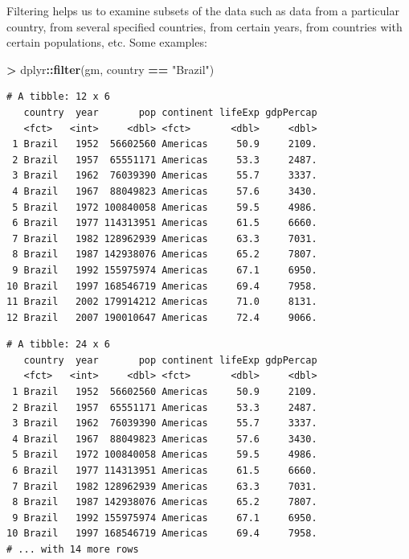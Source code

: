 \documentclass[]{krantz}
\makeatletter
\newenvironment{Shaded}{\begin{snugshade}}{\end{snugshade}}
\newcommand{\KeywordTok}[1]{\textcolor[rgb]{0.27,0.27,0.27}{\textbf{#1}}}
\newcommand{\NormalTok}[1]{#1}
\newcommand{\OperatorTok}[1]{\textcolor[rgb]{0.43,0.43,0.43}{\textbf{#1}}}
\newcommand{\StringTok}[1]{\textcolor[rgb]{0.5,0.5,0.5}{#1}}
\newenvironment{kframe}{%
\medskip{}
\setlength{\fboxsep}{.8em}
 \def\at@end@of@kframe{}%
 \ifinner\ifhmode%
  \def\at@end@of@kframe{\end{minipage}}%
  \begin{minipage}{\columnwidth}%
 \fi\fi%
 \def\FrameCommand##1{\hskip\@totalleftmargin \hskip-\fboxsep
 \colorbox{shadecolor}{##1}\hskip-\fboxsep
     \hskip-\linewidth \hskip-\@totalleftmargin \hskip\columnwidth}%
 \MakeFramed {\advance\hsize-\width
   \@totalleftmargin\z@ \linewidth\hsize
   \@setminipage}}%
 {\par\unskip\endMakeFramed%
 \at@end@of@kframe}
\renewenvironment{Shaded}{\begin{kframe}}{\end{kframe}}
\makeatother
\begin{document}
Filtering helps us to examine subsets of the data such as data from a particular country, from several specified countries, from certain years, from countries with certain populations, etc. Some examples:

\begin{Shaded}
\begin{Highlighting}[]
\OperatorTok{>}\StringTok{ }\NormalTok{dplyr}\OperatorTok{::}\KeywordTok{filter}\NormalTok{(gm, country }\OperatorTok{==}\StringTok{ "Brazil"}\NormalTok{)}
\end{Highlighting}
\end{Shaded}

\begin{verbatim}
# A tibble: 12 x 6
   country  year       pop continent lifeExp gdpPercap
   <fct>   <int>     <dbl> <fct>       <dbl>     <dbl>
 1 Brazil   1952  56602560 Americas     50.9     2109.
 2 Brazil   1957  65551171 Americas     53.3     2487.
 3 Brazil   1962  76039390 Americas     55.7     3337.
 4 Brazil   1967  88049823 Americas     57.6     3430.
 5 Brazil   1972 100840058 Americas     59.5     4986.
 6 Brazil   1977 114313951 Americas     61.5     6660.
 7 Brazil   1982 128962939 Americas     63.3     7031.
 8 Brazil   1987 142938076 Americas     65.2     7807.
 9 Brazil   1992 155975974 Americas     67.1     6950.
10 Brazil   1997 168546719 Americas     69.4     7958.
11 Brazil   2002 179914212 Americas     71.0     8131.
12 Brazil   2007 190010647 Americas     72.4     9066.
\end{verbatim}

\begin{Shaded}
\end{Shaded}

\begin{verbatim}
# A tibble: 24 x 6
   country  year       pop continent lifeExp gdpPercap
   <fct>   <int>     <dbl> <fct>       <dbl>     <dbl>
 1 Brazil   1952  56602560 Americas     50.9     2109.
 2 Brazil   1957  65551171 Americas     53.3     2487.
 3 Brazil   1962  76039390 Americas     55.7     3337.
 4 Brazil   1967  88049823 Americas     57.6     3430.
 5 Brazil   1972 100840058 Americas     59.5     4986.
 6 Brazil   1977 114313951 Americas     61.5     6660.
 7 Brazil   1982 128962939 Americas     63.3     7031.
 8 Brazil   1987 142938076 Americas     65.2     7807.
 9 Brazil   1992 155975974 Americas     67.1     6950.
10 Brazil   1997 168546719 Americas     69.4     7958.
# ... with 14 more rows
\end{verbatim}
\end{document}
